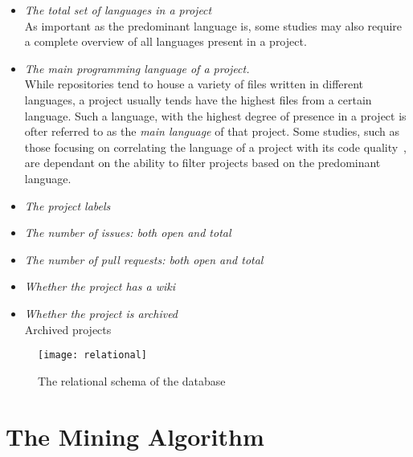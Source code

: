 \begin{itemize}
    \item \textit{The total set of languages in a project}
    \\As important as the predominant language is, some studies may also require a complete overview of all languages present in a project.
    \item \textit{The main programming language of a project.}
    \\While repositories tend to house a variety of files written in different languages, a project usually tends have the highest files from a certain language. Such a language, with the highest degree of presence in a project is ofter referred to as the \textit{main language} of that project. Some studies, such as those focusing on correlating the language of a project with its code quality~\cite{QUALITY}, are dependant on the ability to filter projects based on the predominant language.
    \item \textit{The project labels}
    \item \textit{The number of issues: both open and total}
    \item \textit{The number of pull requests: both open and total}
    \item \textit{Whether the project has a wiki}
    \item \textit{Whether the project is archived}
    \\Archived projects
\end{itemize}


\begin{figure}[ht!]
    \centering
    \texttt{[image: relational]}
    \caption{The relational schema of the database}
\end{figure}

\newpage
\section{The Mining Algorithm}

